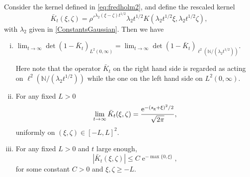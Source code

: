 \documentclass[cmp]{svjour}
\numberwithin{theorem}{section}
\numberwithin{equation}{section}
\DeclareMathOperator{\e}{e}
\begin{document}
\begin{theorem}
Consider the kernel defined in \eqref{eq:fredholm2}, and define the rescaled kernel
\begin{equation*}
 \bar{K}_t( \xi, \zeta) =\rho'^{ \lambda_2 (\xi-\zeta)t^{1/2} }
  \lambda_2 t^{1/2}K(\lambda_2 t^{1/2} \xi,\lambda_2 t^{1/2} \zeta),
\end{equation*}
with $\lambda_2$ given in \eqref{ConstantsGaussian}. Then we have

\begin{enumerate}[(i)]
\item \label{RescaledFredholm} $\displaystyle \lim_{t \to \infty} \det(1-  \bar{K}_t)_{L^2(0,\infty)}= \lim_{t \to \infty} \det(1-\bar{K}_t)_{\ell^2(\mathbb{N}/(\lambda_2 t^{1/2}))}$.

Here note that the operator $\bar{K}_t$ on the right hand side is regarded as acting on $\ell^2(\mathbb{N}/(\lambda_2 t^{1/2}))$ while the one on the left hand side on  $L^2(0,\infty)$.
\item
  For any fixed $L>0$
  \begin{equation*}
    \lim_{t\rightarrow \infty} \bar{K}_t( \xi, \zeta)=
    \frac{\e^{-(s_{\rm g}+\xi)^2 /2}}{\sqrt{2 \pi}},
  \end{equation*}
  uniformly on $(\xi,\zeta)\in[-L,L]^2$.
  \item For any fixed $L>0$ and $t$ large enough,
\begin{equation*}
  | \bar{K}_t ( \xi, \zeta)| \leq C \e^{
  -\max\{0,\xi\}},
\end{equation*}
for some constant $C>0$ and $\xi,\zeta\geq -L$.
\end{enumerate}

\end{theorem}
\end{document}
